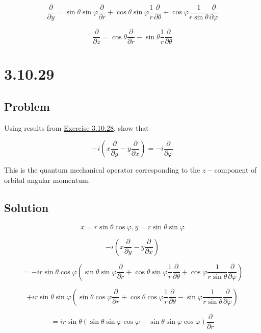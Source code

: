 \documentclass[12pt]{article}
\begin{document}
\[
    \frac{\partial}{\partial y} = \sin{\theta} \sin{\varphi} \frac{\partial}{\partial r}
    + \cos{\theta} \sin{\varphi} \frac{1}{r} \frac{\partial}{\partial \theta}
    + \cos{\varphi} \frac{1}{r \sin{\theta}} \frac{\partial}{\partial \varphi}
\]

\[
    \frac{\partial}{\partial z} = \cos{\theta} \frac{\partial}{\partial r}
    - \sin{\theta} \frac{1}{r} \frac{\partial}{\partial \theta}
\]

\section{3.10.29}

\subsection{Problem}

Using results from \hyperref[3.10.28]{Exercise 3.10.28}, show that

\[
    -i \left(x \frac{\partial}{\partial y} - y \frac{\partial}{\partial x}\right)
    = - i \frac{\partial}{\partial \varphi}
\]

This is the quantum mechanical operator corresponding to the \(z-\)component of orbital
angular momentum.

\subsection{Solution}

\[
    x = r \sin{\theta} \cos{\varphi}, y = r \sin{\theta} \sin{\varphi}
\]

\[
    -i \left(x \frac{\partial}{\partial y} - y \frac{\partial}{\partial x}\right)
\]

\[
    =
    -i r \sin{\theta} \cos{\varphi}
    \left(
    \sin{\theta} \sin{\varphi} \frac{\partial}{\partial r}
    + \cos{\theta} \sin{\varphi} \frac{1}{r} \frac{\partial}{\partial \theta}
    + \cos{\varphi} \frac{1}{r \sin{\theta}} \frac{\partial}{\partial \varphi}
    \right)
\]

\[
    + i r \sin{\theta} \sin{\varphi}
    \left(
    \sin{\theta} \cos{\varphi} \frac{\partial}{\partial r}
    + \cos{\theta} \cos{\varphi} \frac{1}{r} \frac{\partial}{\partial \theta}
    - \sin{\varphi} \frac{1}{r \sin{\theta}} \frac{\partial}{\partial \varphi}
    \right)
\]

\[
    = i r \sin{\theta}
    \left(\sin{\theta} \sin{\varphi} \cos{\varphi} - \sin{\theta} \sin{\varphi} \cos{\varphi} \right)
    \frac{\partial}{\partial r}
\]
\end{document}

